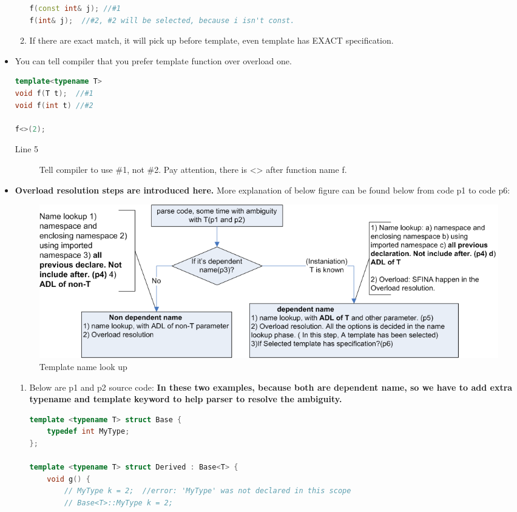 \documentclass[a4paper,11pt,twoside]{book}
\begin{document}
\begin{itemize}
\begin{enumerate}
\begin{lstlisting}[frame=single, language=c++]
f(const int& j); //#1
f(int& j);  //#2, #2 will be selected, because i isn't const.
\end{lstlisting}

		\item If there are exact match, it will pick up before template, even template has EXACT specification.
\end{enumerate}

	\item You can tell compiler that you prefer template function over overload one.

\begin{lstlisting}[frame=single, language=c++]
template<typename T>
void f(T t);  //#1
void f(int t) //#2

f<>(2); 
\end{lstlisting}
\begin{description}
	\item[Line 5] Tell compiler to use \#1, not \#2. Pay attention, there is <> after function name f.
\end{description}

    \item \textbf{Overload resolution steps are introduced here.} More explanation of below figure can be found below from code p1 to code p6:

\begin{figure}[ht]
	\centering 
	\includegraphics[width=0.8\linewidth]{pics/template.png}
	\caption{Template name look up}
	\label{fig:command}
\end{figure}

\begin{enumerate}

\item Below are p1 and p2 source code: \textbf{In these two examples, because both are dependent name, so we have to add extra typename and template keyword to help parser to resolve the ambiguity.}

\begin{lstlisting}[frame=single, language=c++]
template <typename T> struct Base {
	typedef int MyType;
};

template <typename T> struct Derived : Base<T> {
	void g() {
		// MyType k = 2;  //error: 'MyType' was not declared in this scope
		// Base<T>::MyType k = 2;
		

\end{lstlisting}
\end{enumerate}
\end{itemize}
\end{document}
